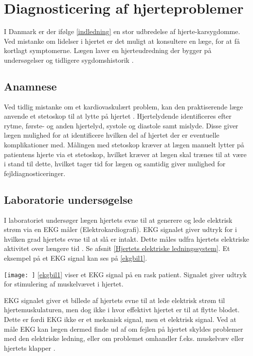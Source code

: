 \section{Diagnosticering af hjerteproblemer}

I Danmark er der ifølge \ref{indledning}  en stor udbredelse af hjerte-karsygdomme. Ved mistanke om lidelser i hjertet er det muligt at konsultere en læge, for at få kortlagt symptomerne. Lægen laver en hjerteudredning der bygger på undersøgelser og tidligere sygdomshistorik \citep{hjerud}.

\subsection{Anamnese}
Ved tidlig mistanke om et kardiovaskulært problem, kan den praktiserende læge anvende et stetoskop til at lytte på hjertet \citep{subob}. Hjertelydende identificeres efter rytme, første- og anden hjertelyd, systole og diastole samt mislyde. Disse giver lægen mulighed for at identificere hvilken del af hjertet der er eventuelle komplikationer med. Målingen med stetoskop kræver at lægen manuelt lytter på patientens hjerte via et stetoskop, hvilket kræver at lægen skal trænes til at være i stand til dette, hvilket tager tid for lægen og samtidig giver mulighed for fejldiagnosticeringer. 

\subsection{Laboratorie undersøgelse}
I laboratoriet undersøger lægen hjertets evne til at generere og lede elektrisk strøm via en EKG måler (Elektrokardiografi). EKG signalet giver udtryk for i hvilken grad hjertets evne til at slå er intakt. Dette måles udfra hjertets elektriske aktivitet over længere tid \citep{ekg}. Se afsnit \ref{Hjertets elektriske ledningssystem}. Et eksempel på et EKG signal kan ses på \ref{ekgbil1}. 

\label{ekgbil1}
\texttt{[image: ]}
\ref{ekgbil1} viser et EKG signal på en rask patient. Signalet giver udtryk for stimulering af muskelvævet i hjertet. 

EKG signalet giver et billede af hjertets evne til at lede elektrisk strøm til hjertemuskulaturen, men dog ikke i hvor effektivt hjertet er til at flytte blodet. Dette er fordi EKG ikke er et mekanisk signal, men et elektrisk signal. Ved at måle EKG kan lægen dermed finde ud af om fejlen på hjertet skyldes problemer med den elektriske ledning, eller om problemet omhandler f.eks. muskelvæv eller hjertets klapper \citep{ekg}. 

